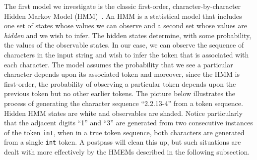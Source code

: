 The first model we investigate is the classic first-order,
character-by-character Hidden Markov Model (HMM)~\cite{rabiner89:hmm}.
An HMM is a statistical model that includes one set of
states whose values we can observe and a second set whose values are
{\em hidden} and we wish to infer.  The hidden states determine, with
some probability, the values of the observable states.  In our case,
we can observe the sequence of characters in the input string and wish
to infer the token that is associated with each character.  
The model assumes the probability that we see a particular character 
depends upon its associated token and moreover, since the
HMM is first-order, the probability of observing a
particular token depends upon the previous token but no other
earlier tokens.  The picture below illustrates the process of
generating the character sequence ``2.2.13-4'' from a token
sequence.  Hidden HMM states are white and observables are shaded.  
Notice particularly that the adjacent digits ``1'' and ``3'' are 
generated from two consecutive instances of the token {\tt int},
when in a true token sequence, both characters are generated from 
a single {\tt int} token.  A postpass will clean this up, but such 
situations are dealt with more effectively by the HMEMs described in
the following subsection.



\begin{center}
\end{center}

